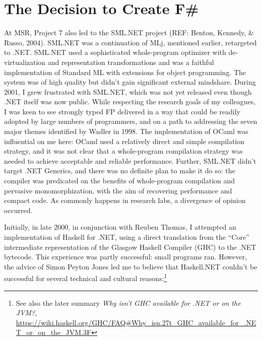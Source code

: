 \documentclass[acmsmall,review]{acmart}\settopmatter{printfolios=true,printccs=false,printacmref=false}
\begin{document}
\section*{The Decision to Create F\#}

At MSR, Project 7 also led to the SML.NET project (REF: Benton, Kennedy, \& Russo, 2004).  SML.NET was a continuation of MLj, mentioned earlier, retargeted to .NET.  SML.NET used a sophisticated whole-program optimizer with de-virtualization and representation transformations and was a faithful implementation of Standard ML with extensions for object programming. The system was of high quality but didn’t gain significant external mindshare.   During 2001, I grew frustrated with SML.NET, which was not yet released even though .NET itself was now public. While respecting the research goals of my colleagues, I was keen to see strongly typed FP delivered in a way that could be readily adopted by large numbers of programmers, and on a path to addressing the seven major themes identified by Wadler in 1998.  The implementation of OCaml was influential on me here: OCaml used a relatively direct and simple compilation strategy, and it was not clear that a whole-program compilation strategy was needed to achieve acceptable and reliable performance.  Further, SML.NET didn’t target .NET Generics, and there was no definite plan to make it do so: the compiler was predicated on the benefits of whole-program compilation and pervasive monomorphization, with the aim of recovering performance and compact code.  As commonly happens in research labs, a divergence of opinion occurred.


Initially, in late 2000, in conjunction with Reuben Thomas, I attempted an implementation of Haskell for .NET, using a direct translation from the “Core” intermediate representation of the Glasgow Haskell Compiler (GHC) to the .NET bytecode. This experience was partly successful: small programs ran. However, the advice of Simon Peyton Jones led me to believe that Haskell.NET couldn’t be successful for several technical and cultural reasons:\footnote{See also the later summary \textit{Why isn't GHC available for .NET or on the JVM?}, \url{https://wiki.haskell.org/GHC/FAQ\#Why_isn.27t_GHC_available_for_.NET_or_on_the_JVM.3F}} 
\end{document}
